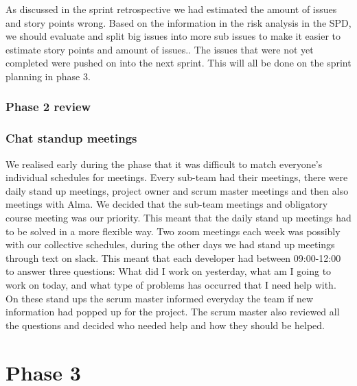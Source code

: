 \documentclass{article}
\begin{document}
As discussed in the sprint retrospective we had estimated the amount of issues and story points wrong. Based on the information in the risk analysis in the SPD, we should evaluate and split big issues into more sub issues to make it easier to estimate story points and amount of issues.. The issues that were not yet completed were pushed on into the next sprint. This will all be done on the sprint planning in phase 3.

\subsubsection{Phase 2 review}

\subsubsection{Chat standup meetings}
We realised early during the phase that it was difficult to match everyone's individual schedules for meetings. Every sub-team had their meetings, there were daily stand up meetings, project owner and scrum master meetings and then also meetings with Alma. We decided that the sub-team meetings and obligatory course meeting was our priority. This meant that the daily stand up meetings had to be solved in a more flexible way. Two zoom meetings each week was possibly with our collective schedules, during the other days we had stand up meetings through text on slack. This meant that each developer had between 09:00-12:00 to answer three questions: What did I work on yesterday, what am I going to work on today, and what type of problems has occurred that I need help with. On these stand ups the scrum master informed everyday the team if new information had popped up for the project. The scrum master also reviewed all the questions and decided who needed help and how they should be helped.


\section{Phase 3} %
\end{document}
